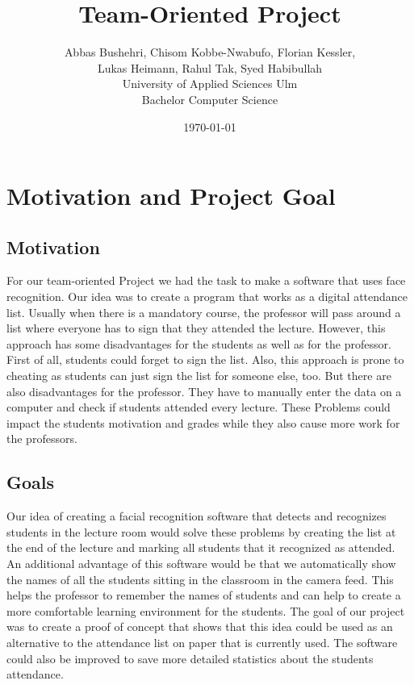 \documentclass[12pt, a4paper]{article}
\title{Team-Oriented Project}
\author{Abbas Bushehri, Chisom Kobbe-Nwabufo, Florian Kessler,\\
	Lukas Heimann, Rahul Tak, Syed Habibullah \\
	University of Applied Sciences Ulm  \\
	Bachelor Computer Science 
	}
\date{\today}
\begin{document}
\maketitle




\newpage



\tableofcontents



\newpage

\section{Motivation and Project Goal}
\subsection{Motivation}
For our team-oriented Project we had the task to make a software that uses face recognition. Our idea was to create a program that works as a digital attendance list. Usually when there is a mandatory course, the professor will pass around a list where everyone has to sign that they attended the lecture. However, this approach has some disadvantages for the students as well as for the professor. First of all, students could forget to sign the list. Also, this approach is prone to cheating as students can just sign the list for someone else, too. But there are also disadvantages for the professor. They have to manually enter the data on a computer and check if students attended every lecture. These Problems could impact the students motivation and grades while they also cause more work for the professors. 

\subsection{Goals}
Our idea of creating a facial recognition software that detects and recognizes students in the lecture room would solve these problems by creating the list at the end of the lecture and marking all students that it recognized as attended. An additional advantage of this software would be that we automatically show the names of all the students sitting in the classroom in the camera feed. This helps the professor to remember the names of students and can help to create a more comfortable learning environment for the students. The goal of our project was to create a proof of concept that shows that this idea could be used as an alternative to the attendance list on paper that is currently used. The software could also be improved to save more detailed statistics about the students attendance. 
\end{document}
